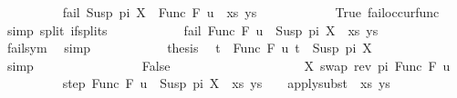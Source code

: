 \begin{isabellebody}
\ \ \ \ \ \ \ \ \isamarkupfalse%
\ {\isachardoublequoteopen}fail\ {\isacharparenleft}{\kern0pt}{\isacharparenleft}{\kern0pt}Susp\ pi\ X\ {\isasymapprox}{\isacharquery}{\kern0pt}\ Func\ F\ u{\isacharparenright}{\kern0pt}\ {\isacharhash}{\kern0pt}\ xs{\isacharcomma}{\kern0pt}\ ys{\isacharparenright}{\kern0pt}{\isachardoublequoteclose}\isanewline
\ \ \ \ \ \ \ \ \ \ \isamarkupfalse%
\ True\ fail{\isacharunderscore}{\kern0pt}occur{\isacharunderscore}{\kern0pt}func\ \isamarkupfalse%
\ {\isacharparenleft}{\kern0pt}simp\ split{\isacharcolon}{\kern0pt}\ if{\isacharunderscore}{\kern0pt}splits{\isacharparenright}{\kern0pt}\isanewline
\ \ \ \ \ \ \ \ \isamarkupfalse%
\ \isamarkupfalse%
\ {\isachardoublequoteopen}fail\ {\isacharparenleft}{\kern0pt}{\isacharparenleft}{\kern0pt}Func\ F\ u\ {\isasymapprox}{\isacharquery}{\kern0pt}\ Susp\ pi\ X{\isacharparenright}{\kern0pt}\ {\isacharhash}{\kern0pt}\ xs{\isacharcomma}{\kern0pt}\ ys{\isacharparenright}{\kern0pt}{\isachardoublequoteclose}\isanewline
\ \ \ \ \ \ \ \ \ \ \isamarkupfalse%
\ fail{\isacharunderscore}{\kern0pt}sym\ \isamarkupfalse%
\ simp\isanewline
\ \ \ \ \ \ \ \ \isamarkupfalse%
\ \isamarkupfalse%
\ {\isacharquery}{\kern0pt}thesis\ \isamarkupfalse%
\ {\isacartoucheopen}t{}\ {\isacharequal}{\kern0pt}\ Func\ F\ u{\isacartoucheclose}\ {\isacartoucheopen}t{}\ {\isacharequal}{\kern0pt}\ Susp\ pi\ X{\isacartoucheclose}\isanewline
\ \ \ \ \ \ \ \ \ \ \isamarkupfalse%
\ simp\isanewline
\ \ \ \ \ \ \isamarkupfalse%
\isanewline
\ \ \ \ \ \ \ \ \isamarkupfalse%
\ False\isanewline
\ \ \ \ \ \ \ \ %
\isanewline
\ \ \ \ \ \ \ \ \isamarkupfalse%
\ {\isacharquery}{\kern0pt}{\isasymsigma}\ {\isacharequal}{\kern0pt}\ {\isachardoublequoteopen}{\isacharbrackleft}{\kern0pt}{\isacharparenleft}{\kern0pt}X{\isacharcomma}{\kern0pt}\ swap\ {\isacharparenleft}{\kern0pt}rev\ pi{\isacharparenright}{\kern0pt}\ {\isacharparenleft}{\kern0pt}Func\ F\ u{\isacharparenright}{\kern0pt}{\isacharparenright}{\kern0pt}{\isacharbrackright}{\kern0pt}{\isachardoublequoteclose}\isanewline
\ \ \ \ \ \ \ \ \isamarkupfalse%
\ step{\isacharcolon}{\kern0pt}\ {\isachardoublequoteopen}{\isacharparenleft}{\kern0pt}{\isacharparenleft}{\kern0pt}Func\ F\ u\ {\isasymapprox}{\isacharquery}{\kern0pt}\ Susp\ pi\ X{\isacharparenright}{\kern0pt}\ {\isacharhash}{\kern0pt}\ xs{\isacharcomma}{\kern0pt}\ ys{\isacharparenright}{\kern0pt}\ {\isasymturnstile}\ {\isacharquery}{\kern0pt}{\isasymsigma}\ {\isasymleadsto}\ apply{\isacharunderscore}{\kern0pt}subst\ {\isacharquery}{\kern0pt}{\isasymsigma}\ {\isacharparenleft}{\kern0pt}xs{\isacharcomma}{\kern0pt}\ ys{\isacharparenright}{\kern0pt}{\isachardoublequoteclose}\isanewline

\end{isabellebody}
